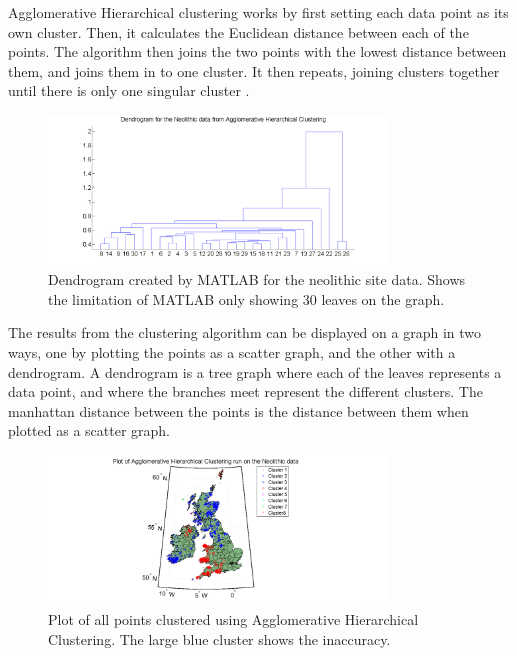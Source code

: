 \documentclass[a4paper]{article}
\begin{document}
Agglomerative Hierarchical clustering works by first setting each data point as its own cluster. Then, it calculates the Euclidean distance between each of the points. The algorithm then joins the two points with the lowest distance between them, and joins them in to one cluster. It then repeats, joining clusters together until there is only one singular cluster \cite{matlabagglo}.

\begin{figure}[H]
\centering
\includegraphics[width=0.8\textwidth]{dendrogram.png}
\caption{\label{fig:dendrogram}Dendrogram created by MATLAB for the neolithic site data. Shows the limitation of MATLAB only showing 30 leaves on the graph.}
\end{figure}

The results from the clustering algorithm can be displayed on a graph in two ways, one by plotting the points as a scatter graph, and the other with a dendrogram\cite{hierarch}. A dendrogram is a tree graph where each of the leaves represents a data point, and where the branches meet represent the different clusters. The manhattan distance between the points is the distance between them when plotted as a scatter graph. 
\newline\newline

\begin{figure}[H]
\centering
\includegraphics[width=0.8\textwidth]{agglo.png}
\caption{\label{fig:agglo}Plot of all points clustered using Agglomerative Hierarchical Clustering. The large blue cluster shows the inaccuracy.}
\end{figure}
\end{document}
